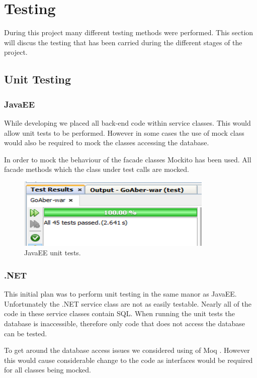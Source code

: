 \chapter{Testing}

During this project many different testing methods were performed. This section will discus the testing that has been carried during the different stages of the project.

\section{Unit Testing}

\subsection{JavaEE}
While developing we placed all back-end code within service classes. This would allow unit tests to be performed. However in some cases the use of mock class would also be required to mock the classes accessing the database. 
	
In order to mock the behaviour of the facade classes Mockito\cite{Mockito} has been used. All facade methods which the class under test calls are mocked. 

\begin{figure}[H]
\begin{center}
\includegraphics[scale=0.6]{images/testing/UnitTestsJavaEE.png} 
\caption{JavaEE unit tests.}
\label{fig:testing_vsBuild}
\end{center}
\end{figure}

\subsection{.NET}
This initial plan was to perform unit testing in the same manor as JavaEE. Unfortunately the .NET service class are not as easily testable. Nearly all of the code in these service classes contain SQL. When running the unit tests the database is inaccessible, therefore only code that does not access the database can be tested. 

To get around the database access issues we considered using of Moq \cite{Moq}. However this would cause considerable change to the code as interfaces would be required for all classes being mocked. 


